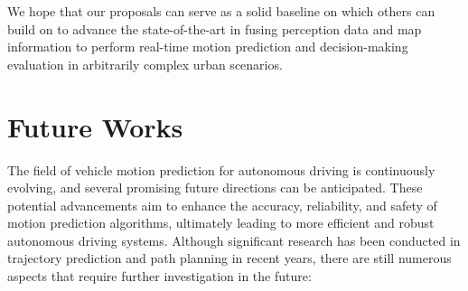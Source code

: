 We hope that our proposals can serve as a solid baseline on which others can build on to advance the state-of-the-art in fusing perception data and map information to perform real-time motion prediction and decision-making evaluation in arbitrarily complex urban scenarios. 

\section{Future Works}
\label{sec:9_future_works}

The field of vehicle motion prediction for autonomous driving is continuously evolving, and several promising future directions can be anticipated. These potential advancements aim to enhance the accuracy, reliability, and safety of motion prediction algorithms, ultimately leading to more efficient and robust autonomous driving systems. Although significant research has been conducted in trajectory prediction and path planning in recent years, there are still numerous aspects that require further investigation in the future:

